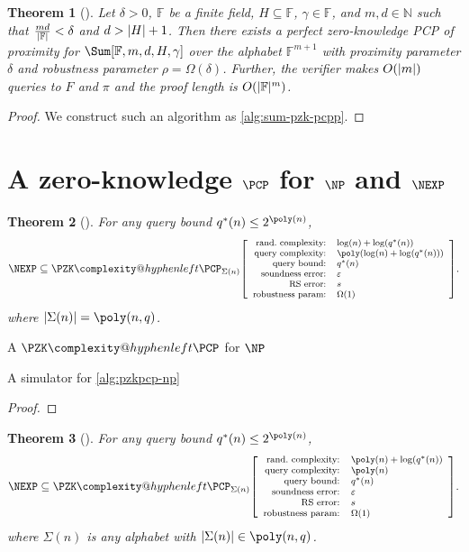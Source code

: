 \documentclass[english,12pt]{reedthesis}
\makeatletter
\theoremstyle{plain}
\newtheorem{thm}{Theorem}[section]
\theoremstyle{definition}
\theoremstyle{remark}
\DeclarePairedDelimiter{\abs}{\lvert}{\rvert}
\newcommand{\pzkpcpr}[6]{%
  \ensuremath%
  \mleft[{\footnotesize\begin{array}{r l}
    \text{rand.\ complexity:} & #1 \\
    \text{query complexity:} & #2 \\
    \text{query bound:} & #3 \\
    \text{soundness error:} & #4 \\
    \text{RS error:} & #5 \\
    \text{robustness param:} & #6
  \end{array}}\mright]%
}
\newcommand{\PZKPCP}{%
  \PZK\complexity@hyphenleft\PCP
}
\makeatother
\begin{document}
\begin{thm}[{\cite[Lemma 5.1]{GOS25}}]\label{thm:pcpp-sum-pzk}
  Let $\delta > 0$, $\mathbb{F}$ be a finite field, $H \subseteq \mathbb{F}$,
  $\gamma \in \mathbb{F}$, and $m, d \in \mathbb{N}$ such that $\frac{md}{\abs{\mathbb{F}}} < \delta$
  and $d > \abs{H} + 1$. Then there exists a perfect zero-knowledge PCP of
  proximity for $\Sum[\mathbb{F}, m, d, H, \gamma]$ over the alphabet
  $\mathbb{F}^{m+1}$ with proximity parameter $\delta$ and robustness parameter
  $\rho = \Omega(\delta)$. Further, the verifier makes $O(\abs{m})$ queries to $F$ and $\pi$
  and the proof length is $O(\abs{\mathbb{F}}^{m})$.
\end{thm}

\begin{proof}
  We construct such an algorithm as \cref{alg:sum-pzk-pcpp}. %
\end{proof}

\section{A zero-knowledge $\PCP$ for $\NP$ and $\NEXP$}\label{sec:pzkpcp-np-nexp}

\begin{thm}[{\cite[Theorem 6.3]{GOS25}}]\label{thm:np-zk-pcp}
  For any query bound $q^{*}(n) \le 2^{\poly(n)}$,
  \[
    \NEXP \subseteq
    \PZKPCP_{\Sigma(n)}\pzkpcpr{\log(n)+\log(q^{*}(n))}{\poly(\log(n) + \log(q^{*}(n)))}{q^{*}(n)}{\varepsilon}{s}{\Omega(1)}.
  \]
  where $\abs{\Sigma(n)} = \poly(n, q)$.
\end{thm}

\begin{algorithm}[htbp]
  \caption{A $\PZKPCP$ for $\NP$~\cite[Theorem 6.3]{GOS25}}\label{alg:pzkpcp-np}
\end{algorithm}

\begin{algorithm}[htbp]
  \caption{A simulator for \cref{alg:pzkpcp-np}}\label{alg:pzkpcp-np-sim}
\end{algorithm}

\begin{proof}
\end{proof}

\begin{thm}[{\cite[Theorem 6.3]{GOS25}}]\label{thm:nexp-zk-pcp}
  For any query bound $q^{*}(n) \le 2^{\poly(n)}$,
  \[
    \NEXP \subseteq
    \PZKPCP_{\Sigma(n)}\pzkpcpr{\poly(n)+\log(q^{*}(n))}{\poly(n)}{q^{*}(n)}{\varepsilon}{s}{\Omega(1)}.
  \]
  where $\Sigma(n)$ is any alphabet with $\abs{\Sigma(n)} \in \poly(n, q)$.
\end{thm}
\end{document}
